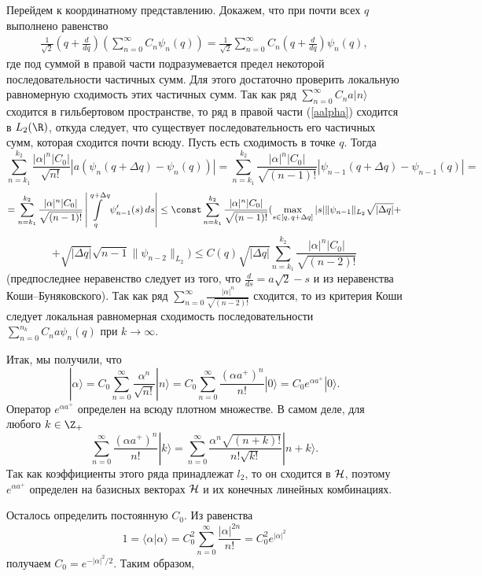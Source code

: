 \documentclass[a4paper
]{article}
\begin{document}
Перейдем к координатному представлению. Докажем, что при почти всех $q$
выполнено равенство
\begin{align}
\label{aalpha}
\frac{1}{\sqrt{2}}\left(q+\frac{d}{dq}\right)
\left(\sum\limits_{n=0}^\infty C_n\psi_n(q)\right)=\frac{1}{\sqrt{2}}
\sum\limits_{n=0}^\infty C_n\left(q+\frac{d}{dq}\right)\psi_n(q),
\end{align}
где под суммой в правой части подразумевается предел некоторой
последовательности частичных сумм. Для этого достаточно проверить
локальную равномерную сходимость этих частичных сумм. Так как ряд
$\sum \limits_{n=0}^\infty C_na|n\rangle$ сходится в гильбертовом
пространстве, то ряд в правой части (\ref{aalpha}) сходится в $L_2(\R)$,
откуда следует, что существует последовательность его частичных сумм,
которая сходится почти всюду. Пусть есть сходимость в точке $q$. Тогда
$$\sum\limits_{n=k_1}^{k_2}\frac{|\alpha|^n|C_0|}{\sqrt{n!}}|a(\psi_n
(q+\Delta q)-\psi_n(q))|=\sum\limits_{n=k_1}^{k_2}\frac{|\alpha|^n|C_0|}
{\sqrt{(n-1)!}}|\psi_{n-1}(q+\Delta q)-\psi_{n-1}(q)|=$$
$$=\sum\limits_{n=k_1}^{k_2}\frac{|\alpha|^n|C_0|}
{\sqrt{(n-1)!}}\left|\int\limits_q^{q+\Delta q}\psi'_{n-1}(s)\, ds\right|\le
\const\sum\limits_{n=k_1}^{k_2}\frac{|\alpha|^n|C_0|}{\sqrt{(n-1)!}}
(\max_{s\in [q, \, q+\Delta q]}|s|\|\psi_{n-1}\|_{L_2}\sqrt{|\Delta q|}+$$
$$+\sqrt{|\Delta q|}\sqrt{n-1}\|\psi_{n-2}\|_{L_2})\le C(q)\sqrt{|\Delta q|}
\sum\limits_{n=k_1}^{k_2}\frac{|\alpha|^n|C_0|}{\sqrt{(n-2)!}}$$
(предпоследнее неравенство следует из того, что $\frac{d}{ds}=a\sqrt{2}-s$
и из неравенства Коши--Буняковского). Так как ряд $\sum\limits_{n=0}^\infty
\frac{|\alpha|^n}{\sqrt{(n-2)!}}$ сходится, то из критерия Коши
следует локальная равномерная сходимость последовательности $\sum\limits
_{n=0}^{n_k} C_na\psi_n(q)$ при $k\rightarrow \infty$. \par
Итак, мы получили, что $$|\alpha\rangle=C_0\sum\limits_{n=0}^\infty
\frac{\alpha^n}{\sqrt{n!}}|n\rangle=C_0\sum\limits_{n=0}^\infty
\frac{(\alpha a^+)^n}{n!}|0\rangle=C_0e^{\alpha a^+}|0\rangle.$$
Оператор $e^{\alpha a^+}$ определен на всюду плотном множестве. В
самом деле, для любого $k\in \Z_+$
$$\sum \limits_{n=0}^\infty\frac{(\alpha a^+)^n}{n!}|k\rangle
=\sum \limits_{n=0}^\infty\frac{\alpha^n\sqrt{(n+k)!}}{n!\sqrt{k!}}
|n+k\rangle.$$
Так как коэффициенты этого ряда принадлежат $l_2$, то он сходится в ${\cal
H}$, поэтому $e^{\alpha a^+}$ определен на базисных векторах
${\cal H}$ и их конечных линейных комбинациях. \par
Осталось определить постоянную $C_0$. Из равенства $$1=\langle \alpha|
\alpha\rangle =C_0^2\sum \limits_{n=0}^\infty \frac{|\alpha|^{2n}}{n!}=C_0^2
e^{|\alpha|^2}$$ получаем $C_0=e^{-|\alpha|^2/2}$. Таким образом,
\end{document}
